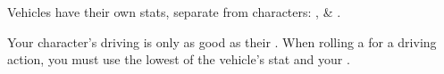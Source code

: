 
Vehicles have their own stats, separate from characters: ,  \& .

Your character's driving is only as good as their \stat{\statSkill}. When rolling a for a driving action, you must use the lowest of the vehicle's stat and your \stat{\statSkill}.
